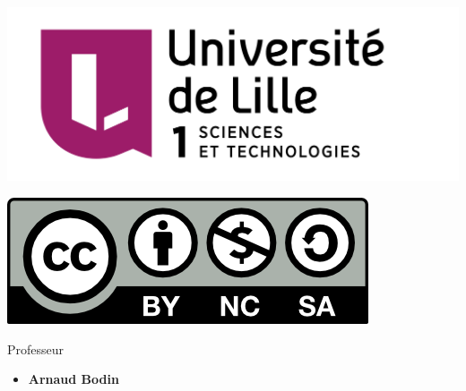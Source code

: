 





\begin{frame}

\thispagestyle{empty}    

  \hspace*{-20ex}
  \begin{minipage}{0.4\textwidth}
  \begin{center}
    \vspace*{5ex}   


    \bigskip

    \includegraphics[scale=0.13]{../divers/Logo-Univ-Lille-1-new.png} 

    \vspace*{5ex}

    \includegraphics[scale=0.5]{../divers/by-nc-sa.png}
  \end{center}
  \end{minipage}
  \hfil
  \begin{minipage}{0.75\textwidth}

   \vspace*{3ex}  

  \small
  Professeur
  \begin{itemize}
    \item {\bf Arnaud Bodin}  
  \end{itemize} 
  

\end{minipage}
\end{frame}
